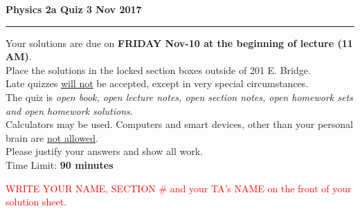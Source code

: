 \documentclass[12pt]{article}
\begin{document}
%
\thispagestyle{empty}
\centerline{\large\bf Physics 2a \hfill Quiz 3 \hfill  Nov 2017}

\medskip

\hrule
\bigskip
Your solutions are due on \textbf{FRIDAY Nov-10 at the beginning of lecture
(11 AM)}. \\

Place the solutions in the locked section boxes outside of 201
E. Bridge. \\

Late quizzes \underline{will not} be accepted, except in very special
circumstances. \\

The quiz is \emph{open book, open lecture notes, open section notes,
  open homework sets and
open homework solutions}. \\

Calculators may be used. Computers and smart devices, other than your
personal brain are \underline{not allowed}. \\

Please justify your answers and show all work. \\

Time Limit: \textbf{90 minutes}

\bigskip
\bigskip
\bigskip
\textcolor{red}{WRITE YOUR NAME, SECTION \# and your TA's NAME on the front of your
solution sheet}.



\clearpage



\clearpage

\end{document}
